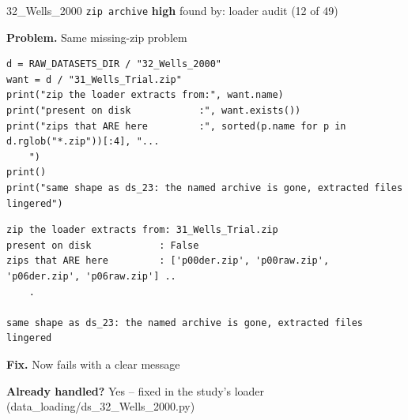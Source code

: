 \documentclass[9pt, t, handout]{beamer}
\newcommand{\ans}[1]{\textcolor{structure.fg}{#1}}
\begin{document}
\begin{frame}[fragile]{32\_Wells\_2000 \quad \texttt{zip archive}}
  {\scriptsize\textcolor{orange!80!black}{\textbf{high}} \quad
   found by: loader audit \quad (12 of 49)}
  \vspace{3pt}

  {\footnotesize \textbf{Problem.} Same missing-zip problem}
  \vspace{4pt}

  \begin{Verbatim}[fontsize=\tiny, frame=single, framesep=2pt, label=\tiny reproduce]
d = RAW_DATASETS_DIR / "32_Wells_2000"
want = d / "31_Wells_Trial.zip"
print("zip the loader extracts from:", want.name)
print("present on disk            :", want.exists())
print("zips that ARE here         :", sorted(p.name for p in d.rglob("*.zip"))[:4], "...
    ")
print()
print("same shape as ds_23: the named archive is gone, extracted files lingered")
  \end{Verbatim}
  \begin{Verbatim}[fontsize=\tiny, frame=single, framesep=2pt, label=\tiny output]
zip the loader extracts from: 31_Wells_Trial.zip
present on disk            : False
zips that ARE here         : ['p00der.zip', 'p00raw.zip', 'p06der.zip', 'p06raw.zip'] ..
    .

same shape as ds_23: the named archive is gone, extracted files lingered
  \end{Verbatim}
  \vspace{2pt}

  {\footnotesize \textbf{Fix.} Now fails with a clear message}
  \vspace{2pt}

  {\footnotesize \textbf{Already handled?} \ans{Yes} -- fixed in the study's loader
   (data\_loading/ds\_32\_Wells\_2000.py)}
\end{frame}
\end{document}
